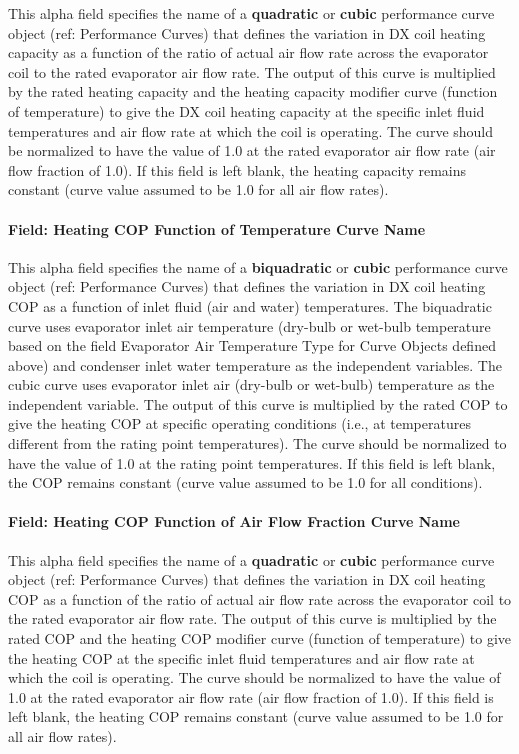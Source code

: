 This alpha field specifies the name of a \textbf{quadratic} or \textbf{cubic} performance curve object (ref: Performance Curves) that defines the variation in DX coil heating capacity as a function of the ratio of actual air flow rate across the evaporator coil to the rated evaporator air flow rate. The output of this curve is multiplied by the rated heating capacity and the heating capacity modifier curve (function of temperature) to give the DX coil heating capacity at the specific inlet fluid temperatures and air flow rate at which the coil is operating. The curve should be normalized to have the value of 1.0 at the rated evaporator air flow rate (air flow fraction of 1.0). If this field is left blank, the heating capacity remains constant (curve value assumed to be 1.0 for all air flow rates).

\paragraph{Field: Heating COP Function of Temperature Curve Name}\label{field-heating-cop-function-of-temperature-curve-name-1}

This alpha field specifies the name of a \textbf{biquadratic} or \textbf{cubic} performance curve object (ref: Performance Curves) that defines the variation in DX coil heating COP as a function of inlet fluid (air and water) temperatures. The biquadratic curve uses evaporator inlet air temperature (dry-bulb or wet-bulb temperature based on the field Evaporator Air Temperature Type for Curve Objects defined above) and condenser inlet water temperature as the independent variables. The cubic curve uses evaporator inlet air (dry-bulb or wet-bulb) temperature as the independent variable. The output of this curve is multiplied by the rated COP to give the heating COP at specific operating conditions (i.e., at temperatures different from the rating point temperatures). The curve should be normalized to have the value of 1.0 at the rating point temperatures. If this field is left blank, the COP remains constant (curve value assumed to be 1.0 for all conditions).

\paragraph{Field: Heating COP Function of Air Flow Fraction Curve Name}\label{field-heating-cop-function-of-air-flow-fraction-curve-name-1}

This alpha field specifies the name of a \textbf{quadratic} or \textbf{cubic} performance curve object (ref: Performance Curves) that defines the variation in DX coil heating COP as a function of the ratio of actual air flow rate across the evaporator coil to the rated evaporator air flow rate. The output of this curve is multiplied by the rated COP and the heating COP modifier curve (function of temperature) to give the heating COP at the specific inlet fluid temperatures and air flow rate at which the coil is operating. The curve should be normalized to have the value of 1.0 at the rated evaporator air flow rate (air flow fraction of 1.0). If this field is left blank, the heating COP remains constant (curve value assumed to be 1.0 for all air flow rates).

